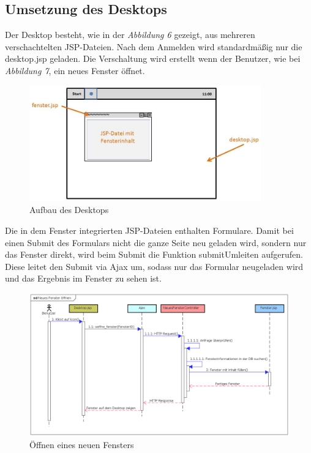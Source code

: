 \documentclass[12pt, a4paper]{article}
\begin{document}
\subsection{Umsetzung des Desktops}
Der Desktop besteht, wie in der \textit{Abbildung 6} gezeigt, aus mehreren verschachtelten JSP-Dateien. Nach dem Anmelden wird standardmäßig nur die \glqq desktop.jsp\grqq{} geladen. Die Verschaltung wird erstellt wenn der Benutzer, wie bei \textit{Abbildung 7}, ein neues Fenster öffnet.

\begin{figure}[H]
	\begin{center}
		\includegraphics[width=100mm]{Bilder/desktop.jpg}
	\end{center}
	\caption{Aufbau des Desktops}
\end{figure}

Die in dem Fenster integrierten JSP-Dateien enthalten Formulare. Damit bei einen Submit des Formulars nicht die ganze Seite neu geladen wird, sondern nur das Fenster direkt, wird beim Submit die Funktion \glqq submitUmleiten\grqq{} aufgerufen. Diese leitet den Submit via Ajax um, sodass nur das Formular neugeladen wird und das Ergebnis im Fenster zu sehen ist.



\begin{figure}[H]
	\begin{center}
		\includegraphics[width=165mm]{Bilder/fenster_oeffnen_sd.png}
	\end{center}
	\caption{Öffnen eines neuen Fensters}
\end{figure}
\end{document}
